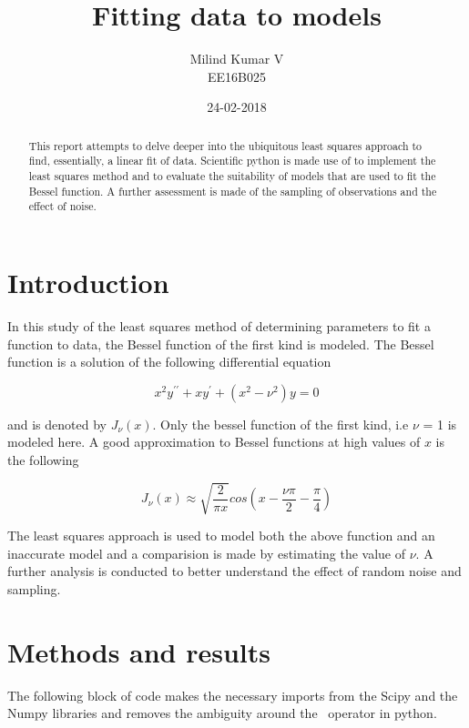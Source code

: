\documentclass[a4paper, 11pt, margin= 1.25cm ]{article}
\title{Fitting data to models}
\date{24-02-2018}
\author{Milind Kumar V\\ EE16B025}
\begin{document}
    
    
    \maketitle
    
    

    \begin{multicols}{2}
    \begin{abstract}\label{abstract}

This report attempts to delve deeper into the ubiquitous least squares
approach to find, essentially, a linear fit of data. Scientific python is
made use of to implement the least squares method and to evaluate the
suitability of models that are used to fit the Bessel function. A
further assessment is made of the sampling of observations and the
effect of noise.
\end{abstract}

    \section{Introduction}\label{introduction}


In this study of the least squares method of determining parameters to
fit a function to data, the Bessel function of the first kind is
modeled. The Bessel function is a solution of the following differential
equation

\begin{equation}
x^2y^{\prime\prime} + xy^{\prime} + (x^2- \nu^2)y = 0
\end{equation}

and is denoted by $J_\nu(x)$. Only the bessel function of the first
kind, i.e $\nu$ = 1 is modeled here. A good approximation to Bessel
functions at high values of $x$ is the following

\begin{equation}
J_\nu(x) \approx \sqrt{\frac{2}{\pi x}}cos\left(x-\frac{\nu\pi}{2}- \frac{\pi}{4}\right)
\end{equation}

The least squares approach is used to model both the above function and
an inaccurate model and a comparision is made by estimating the value of
$\nu$. A further analysis is conducted to better understand the effect
of random noise and sampling.

    \section{Methods and results}\label{methods-and-results}

The following block of code makes the necessary imports from the Scipy
and the Numpy libraries and removes the ambiguity around the ~operator
in python.
\end{multicols}
\end{document}
